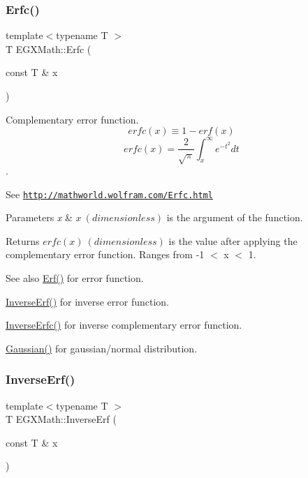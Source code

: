 \subsubsection{\texorpdfstring{Erfc()}{Erfc()}}
{\footnotesize\ttfamily template$<$typename T $>$ \\
T E\+G\+X\+Math\+::\+Erfc (\begin{DoxyParamCaption}\item[{const T \&}]{x }\end{DoxyParamCaption})}



Complementary error function. \[ erfc(x)\equiv 1-erf(x) \] \[ erfc(x)=\frac{2}{\sqrt{\pi}}\int_x^\infty e^{-t^2}dt \]. 

See \href{http://mathworld.wolfram.com/Erfc.html}{\tt http\+://mathworld.\+wolfram.\+com/\+Erfc.\+html} 
\begin{DoxyParams}{Parameters}
{\em x} & $x\ (dimensionless)$ is the argument of the function. \\
\hline
\end{DoxyParams}
\begin{DoxyReturn}{Returns}
$erfc(x)\ (dimensionless)$ is the value after applying the complementary error function. Ranges from -\/1 $<$ x $<$ 1. 
\end{DoxyReturn}
\begin{DoxySeeAlso}{See also}
\mbox{\hyperlink{group___e_g_x_math-_functions-_e_r_f_ga167bde890986906e6cd3b32adaa8e6a8}{Erf()}} for error function. 

\mbox{\hyperlink{group___e_g_x_math-_functions-_e_r_f_gab7cacb258ac31ab3929204dc1ed93400}{Inverse\+Erf()}} for inverse error function. 

\mbox{\hyperlink{group___e_g_x_math-_functions-_e_r_f_gad1f81a581f9f2d66a1a4bad2578c3368}{Inverse\+Erfc()}} for inverse complementary error function. 

\mbox{\hyperlink{group___e_g_x_math-_functions-_gaussian_ga647b46315081e299edc16a1c7f4e4032}{Gaussian()}} for gaussian/normal distribution. 
\end{DoxySeeAlso}
\mbox{\label{group___e_g_x_math-_functions-_e_r_f_gab7cacb258ac31ab3929204dc1ed93400}} 
\subsubsection{\texorpdfstring{Inverse\+Erf()}{InverseErf()}}
{\footnotesize\ttfamily template$<$typename T $>$ \\
T E\+G\+X\+Math\+::\+Inverse\+Erf (\begin{DoxyParamCaption}\item[{const T \&}]{x }\end{DoxyParamCaption})}




